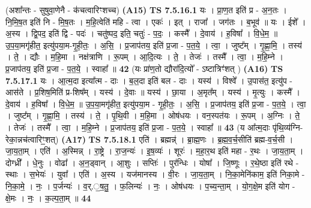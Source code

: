 \documentclass[17pt]{extarticle}
\begin{document}
                  \newline
                      (अशा᳚न्तः - सुषुवा॒णेनै - क॑चत्वारिꣳशच्च)  \textbf{(A15)} \newline \newline
                                \textbf{ TS 7.5.16.1} \newline
                  यः । प्रा॒ण॒त इति॑ प्र - अ॒न॒तः । नि॒मि॒ष॒त इति॑ नि - मि॒ष॒तः । म॒हि॒त्वेति॑ महि - त्वा । एकः॑ । इत् । राजा᳚ । जग॑तः । ब॒भूव॑ ॥ यः । ईशे᳚ । अ॒स्य । द्वि॒पद॒ इति॑ द्वि - पदः॑ । चतु॑ष्पद॒ इति॒ चतुः॑ - प॒दः॒ । कस्मै᳚ । दे॒वाय॑ । ह॒विषा᳚ । वि॒धे॒म॒ ॥ उ॒प॒या॒मगृ॑हीत॒ इत्यु॑पया॒म-गृ॒ही॒तः॒ । अ॒सि॒ । प्र॒जाप॑तय॒ इति॑ प्र॒जा - प॒त॒ये॒ । त्वा॒ । जुष्ट᳚म् । गृ॒ह्णा॒मि॒ । तस्य॑ । ते॒ । द्यौः । म॒हि॒मा । नक्ष॑त्राणि । रू॒पम् । आ॒दि॒त्यः । ते॒ । तेजः॑ । तस्मै᳚ । त्वा॒ । म॒हि॒म्ने । प्र॒जाप॑तय॒ इति॑ प्र॒जा - प॒त॒ये॒ । स्वाहा᳚ ॥ \textbf{  42} \newline
                  \newline
                      (यः प्रा॑ण॒तो द्यौरा॑दि॒त्यो᳚ - ऽष्टात्रिꣳ॑शत् )  \textbf{(A16)} \newline \newline
                                \textbf{ TS 7.5.17.1} \newline
                  यः । आ॒त्म॒दा इत्या᳚त्म - दाः । ब॒ल॒दा इति॑ बल - दाः । यस्य॑ । विश्वे᳚ । उ॒पास॑त॒ इत्यु॑प - आस॑ते । प्र॒शिष॒मिति॑ प्र-शिष᳚म् । यस्य॑ । दे॒वाः ॥ यस्य॑ । छा॒या । अ॒मृत᳚म् । यस्य॑ । मृ॒त्युः । कस्मै᳚ । दे॒वाय॑ । ह॒विषा᳚ । वि॒धे॒म॒ ॥ उ॒प॒या॒मगृ॑हीत॒ इत्यु॑पया॒म - गृ॒ही॒तः॒ । अ॒सि॒ । प्र॒जाप॑तय॒ इति॑ प्र॒जा - प॒त॒ये॒ । त्वा॒ । जुष्ट᳚म् । गृ॒ह्णा॒मि॒ । तस्य॑ । ते॒ । पृ॒थि॒वी । म॒हि॒मा । ओष॑धयः । वन॒स्पत॑यः । रू॒पम् । अ॒ग्निः । ते॒ । तेजः॑ । तस्मै᳚ । त्वा॒ । म॒हि॒म्ने । प्र॒जाप॑तय॒ इति॑ प्र॒जा - प॒त॒ये॒ । स्वाहा᳚ ॥ \textbf{  43 } \newline
                  \newline
                      (य आ᳚त्म॒दाः पृ॑थि॒व्य॑ग्नि-रेका॒न्नच॑त्वारिꣳ॒॒शत्)  \textbf{(A17)} \newline \newline
                                \textbf{ TS 7.5.18.1} \newline
                  एति॑ । ब्रह्मन्न्॑ । ब्रा॒ह्म॒णः । ब्र॒ह्म॒व॒र्च॒सीति॑ ब्रह्म-व॒र्च॒सी । जा॒य॒ता॒म् । एति॑ । अ॒स्मिन्न् । रा॒ष्ट्रे । रा॒ज॒न्यः॑ । इ॒ष॒व्यः॑ । शूरः॑ । म॒हा॒र॒थ इति॑ महा - र॒थः । जा॒य॒ता॒म् । दोग्ध्री᳚ । धे॒नुः । वोढा᳚ । अ॒न॒ड्वान् । आ॒शुः । सप्तिः॑ । पुर॑न्धिः । योषा᳚ । जि॒ष्णूः । र॒थे॒ष्ठा इति॑ रथे - स्थाः । स॒भेयः॑ । युवा᳚ । एति॑ । अ॒स्य । यज॑मानस्य । वी॒रः । जा॒य॒ता॒म् । नि॒का॒मेनि॑काम॒ इति॑ निका॒मे - नि॒का॒मे॒ । नः॒ । प॒र्जन्यः॑ । व॒र्.॒ष॒तु॒ । फ॒लिन्यः॑ । नः॒ । ओष॑धयः । प॒च्य॒न्ता॒म् । यो॒ग॒क्षे॒म इति॑ योग - क्षे॒मः । नः॒ । क॒ल्प॒ता॒म् ॥ \textbf{  44} \newline
\end{document}
